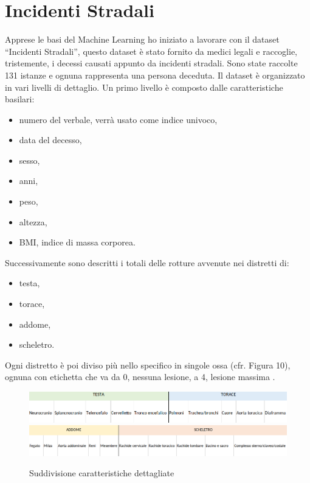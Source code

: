 \documentclass[12pt,italian]{report}
\begin{document}
\section{Incidenti Stradali}
\label{incidentiStradali}
Apprese le basi del Machine Learning ho iniziato a lavorare con il dataset ``Incidenti Stradali'', questo dataset è stato fornito da medici legali e raccoglie, tristemente, i decessi causati appunto da incidenti stradali. Sono state raccolte 131 istanze e ognuna rappresenta una persona deceduta. Il dataset è organizzato in vari livelli di dettaglio. Un primo livello è composto dalle  caratteristiche basilari:
\begin{itemize}
	\item numero del verbale, verrà usato come indice univoco,
	\item data del decesso,
	\item sesso,
	\item anni,
	\item peso,
	\item altezza,
	\item BMI, indice di massa corporea.
\end{itemize}
Successivamente sono descritti i totali delle rotture avvenute nei distretti di:
\begin{itemize}
	\item testa,
	\item torace,
	\item addome,
	\item scheletro.
\end{itemize}
Ogni distretto è poi diviso più nello specifico in singole ossa (cfr. Figura 10), ognuna con etichetta che va da 0, nessuna lesione, a 4, lesione massima .
\begin{figure}[h]
	\centering
	\includegraphics[width = \textwidth]{immagini/testa-torace-dataset}
	\includegraphics[width = \textwidth]{immagini/addome-scheletro-dataset}
	\caption{Suddivisione caratteristiche dettagliate}
\end{figure}
\end{document}
